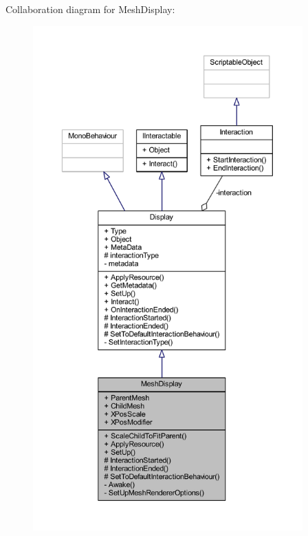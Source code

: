 Collaboration diagram for Mesh\+Display\+:
\nopagebreak
\begin{figure}[H]
\begin{center}
\leavevmode
\includegraphics[height=550pt]{class_mesh_display__coll__graph}
\end{center}
\end{figure}
